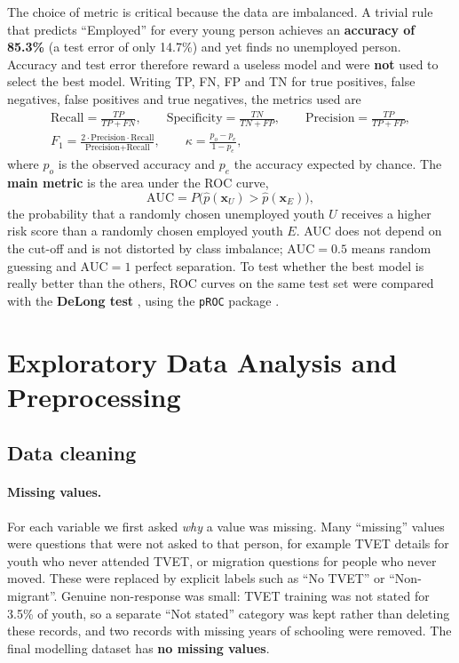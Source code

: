 \documentclass[11pt,a4paper]{article}
\begin{document}
The choice of metric is critical because the data are imbalanced. A trivial rule that predicts
``Employed'' for every young person achieves an \textbf{accuracy of 85.3\%} (a test error of only
14.7\%) and yet finds no unemployed person. Accuracy and test error therefore reward a useless model
and were \textbf{not} used to select the best model. Writing TP, FN, FP and TN for true positives,
false negatives, false positives and true negatives, the metrics used are
\begin{gather}
\text{Recall}=\frac{TP}{TP+FN},\qquad
\text{Specificity}=\frac{TN}{TN+FP},\qquad
\text{Precision}=\frac{TP}{TP+FP},\\[4pt]
F_1=\frac{2\cdot\text{Precision}\cdot\text{Recall}}{\text{Precision}+\text{Recall}},\qquad
\kappa=\frac{p_o-p_e}{1-p_e},
\end{gather}
where $p_o$ is the observed accuracy and $p_e$ the accuracy expected by chance. The \textbf{main
metric} is the area under the ROC curve,
\begin{equation}
\text{AUC}=P\big(\hat p(\mathbf{x}_U) > \hat p(\mathbf{x}_E)\big),
\end{equation}
the probability that a randomly chosen unemployed youth $U$ receives a higher risk score than a
randomly chosen employed youth $E$. AUC does not depend on the cut-off and is not distorted by class
imbalance; $\text{AUC}=0.5$ means random guessing and $\text{AUC}=1$ perfect separation. To test
whether the best model is really better than the others, ROC curves on the same test set were
compared with the \textbf{DeLong test} \cite{delong}, using the \texttt{pROC} package \cite{proc}.

\section{Exploratory Data Analysis and Preprocessing}

\subsection{Data cleaning}
\paragraph{Missing values.} For each variable we first asked \emph{why} a value was missing. Many
``missing'' values were questions that were not asked to that person, for example TVET details for
youth who never attended TVET, or migration questions for people who never moved. These were replaced
by explicit labels such as ``No TVET'' or ``Non-migrant''. Genuine non-response was small: TVET
training was not stated for 3.5\% of youth, so a separate ``Not stated'' category was kept rather than
deleting these records, and two records with missing years of schooling were removed. The final
modelling dataset has \textbf{no missing values}.
\end{document}
